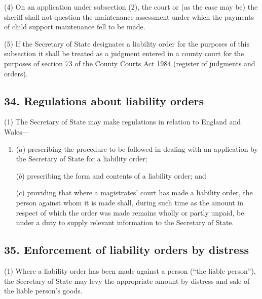 \documentclass[12pt,a4paper]{article}
\begin{document}
(4) On an application under subsection (2), the court or (as the case may be) the sheriff shall not question the maintenance assessment under which the payments of child support maintenance fell to be made.

(5) If the Secretary of State designates a liability order for the purposes of this subsection it shall be treated as a judgment entered in a county court for the purposes of section 73 of the County Courts Act 1984 (register of judgments and orders).


\subsection{34. Regulations about liability orders}

(1) The Secretary of State may make regulations in relation to England and Wales—
\begin{enumerate}\item[]
($a$) prescribing the procedure to be followed in dealing with an application by the Secretary of State for a liability order;

($b$) prescribing the form and contents of a liability order; and

($c$) providing that where a magistrates' court has made a liability order, the person against whom it is made shall, during such time as the amount in respect of which the order was made remains wholly or partly unpaid, be under a duty to supply relevant information to the Secretary of State.
\end{enumerate}



\subsection{35. Enforcement of liability orders by distress}

(1) Where a liability order has been made against a person (“the liable person”), the Secretary of State may levy the appropriate amount by distress and sale of the liable person’s goods.
\end{document}
